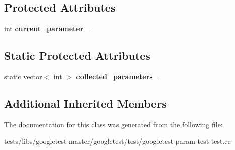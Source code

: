 \subsection*{Protected Attributes}
\begin{DoxyCompactItemize}
\item 
\mbox{\label{classTestGenerationTest_a2d149b987b6dfe86ffbfae677199b0cd}} 
int {\bfseries current\+\_\+parameter\+\_\+}
\end{DoxyCompactItemize}
\subsection*{Static Protected Attributes}
\begin{DoxyCompactItemize}
\item 
\mbox{\label{classTestGenerationTest_a16dfa6f4b445c7e4a7a9611b34b7a7a2}} 
static vector$<$ int $>$ {\bfseries collected\+\_\+parameters\+\_\+}
\end{DoxyCompactItemize}
\subsection*{Additional Inherited Members}


The documentation for this class was generated from the following file\+:\begin{DoxyCompactItemize}
\item 
tests/libs/googletest-\/master/googletest/test/googletest-\/param-\/test-\/test.\+cc\end{DoxyCompactItemize}

